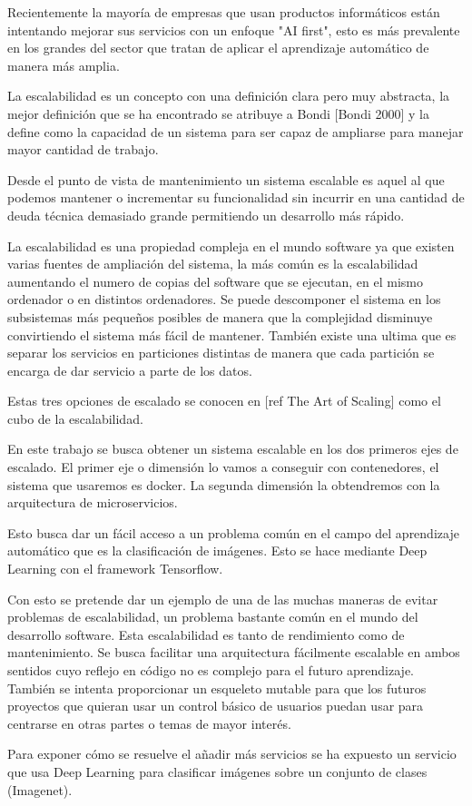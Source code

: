 Recientemente la mayoría de empresas que usan productos informáticos están intentando mejorar sus servicios con un enfoque "AI first", esto es más prevalente en los grandes del sector que  tratan de aplicar el aprendizaje automático de manera más amplia.

La escalabilidad es un concepto con una definición clara pero muy abstracta, la mejor definición que se ha encontrado se atribuye a Bondi [Bondi 2000] y la define como la capacidad de un sistema para ser capaz de ampliarse para manejar mayor cantidad de trabajo. 

Desde el punto de vista de mantenimiento un sistema escalable es aquel al que podemos mantener o incrementar su funcionalidad sin incurrir en una cantidad de deuda técnica demasiado grande permitiendo un desarrollo más rápido.

La escalabilidad es una propiedad compleja en el mundo software ya que existen varias fuentes de ampliación del sistema, la más común es la escalabilidad aumentando el numero de copias del software que se ejecutan, en el mismo ordenador o en distintos ordenadores. Se puede descomponer el sistema en los subsistemas más pequeños posibles de manera que la complejidad disminuye convirtiendo el sistema más fácil de mantener. También existe una ultima que es separar los servicios en particiones distintas de manera que cada partición se encarga de dar servicio a parte de los datos.

Estas tres opciones de escalado se conocen en [ref The Art of Scaling] como el cubo de la escalabilidad. 

En este trabajo se busca obtener un sistema escalable en los dos primeros ejes de escalado. El primer eje o dimensión lo vamos a conseguir con contenedores, el sistema que usaremos es docker. La segunda dimensión la obtendremos con la arquitectura de microservicios. 

Esto busca dar un fácil acceso a un problema común en el campo del aprendizaje automático que es la clasificación de imágenes. Esto se hace mediante Deep Learning con el framework Tensorflow.

Con esto se pretende dar un ejemplo de una de las muchas maneras de evitar problemas de escalabilidad, un problema bastante común en el mundo del desarrollo software. Esta escalabilidad es tanto de rendimiento como de mantenimiento. Se busca facilitar una arquitectura fácilmente escalable en ambos sentidos cuyo reflejo en código no es complejo para el futuro aprendizaje. También se intenta proporcionar un esqueleto mutable para que los futuros proyectos que quieran usar un control básico de usuarios puedan usar para centrarse en otras partes o temas de mayor interés.

Para exponer cómo se resuelve el añadir más servicios se ha expuesto un servicio que usa Deep Learning para clasificar imágenes sobre un conjunto de clases (Imagenet).